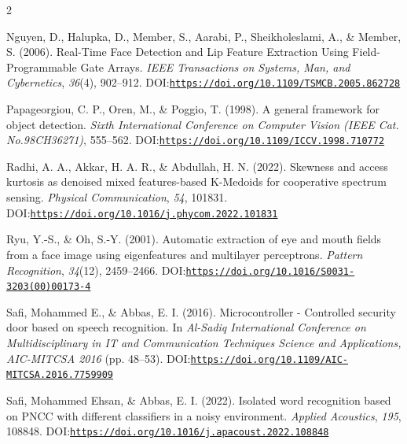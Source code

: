 \documentclass[9pt]{extarticle}
\begin{document}
\begin{multicols}{2}
\begin{list}{}{
    \setlength{\leftmargin}{1.5em}
    \setlength{\itemindent}{-1.5em}
    \setlength{\parsep}{0pt}
    \setlength{\itemsep}{6pt}
}
\item \hypertarget{ref:12}{}Nguyen, D., Halupka, D., Member, S., Aarabi, P., Sheikholeslami, A., \& Member, S. (2006). Real-Time Face Detection and Lip Feature Extraction Using Field-Programmable Gate Arrays. \textit{IEEE Transactions on Systems, Man, and Cybernetics}, \textit{36}(4), 902–912. DOI:\href{https://doi.org/10.1109/TSMCB.2005.862728}{{\nolinkurl{https://doi.org/10.1109/TSMCB.2005.862728}}}

\item \hypertarget{ref:13}{}Papageorgiou, C. P., Oren, M., \& Poggio, T. (1998). A general framework for object detection. \textit{Sixth International Conference on Computer Vision (IEEE Cat. No.98CH36271)}, 555–562. DOI:\href{https://doi.org/10.1109/ICCV.1998.710772}{{\nolinkurl{https://doi.org/10.1109/ICCV.1998.710772}}}

\item \hypertarget{ref:14}{}Radhi, A. A., Akkar, H. A. R., \& Abdullah, H. N. (2022). Skewness and access kurtosis as denoised mixed features-based K-Medoids for cooperative spectrum sensing. \textit{Physical Communication}, \textit{54}, 101831. DOI:\href{https://doi.org/10.1016/j.phycom.2022.101831}{{\nolinkurl{https://doi.org/10.1016/j.phycom.2022.101831}}}

\item \hypertarget{ref:15}{}Ryu, Y.-S., \& Oh, S.-Y. (2001). Automatic extraction of eye and mouth fields from a face image using eigenfeatures and multilayer perceptrons. \textit{Pattern Recognition}, \textit{34}(12), 2459–2466. DOI:\href{https://doi.org/10.1016/S0031-3203(00)00173-4}{{\nolinkurl{https://doi.org/10.1016/S0031-3203(00)00173-4}}}

\item \hypertarget{ref:16}{}Safi, Mohammed E., \& Abbas, E. I. (2016). Microcontroller - Controlled security door based on speech recognition. In \textit{Al-Sadiq International Conference on Multidisciplinary in IT and Communication Techniques Science and Applications, AIC-MITCSA 2016} (pp. 48–53). DOI:\href{https://doi.org/10.1109/AIC-MITCSA.2016.7759909}{{\nolinkurl{https://doi.org/10.1109/AIC-MITCSA.2016.7759909}}}

\item \hypertarget{ref:17}{}Safi, Mohammed Ehsan, \& Abbas, E. I. (2022). Isolated word recognition based on PNCC with different classifiers in a noisy environment. \textit{Applied Acoustics}, \textit{195}, 108848. DOI:\href{https://doi.org/10.1016/j.apacoust.2022.108848}{{\nolinkurl{https://doi.org/10.1016/j.apacoust.2022.108848}}}


\end{list}
\end{multicols}
\end{document}

